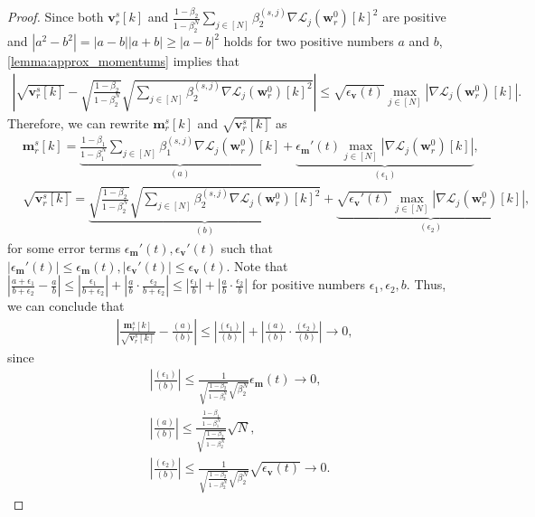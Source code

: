 \documentclass{article} %
\theoremstyle{plain}
\theoremstyle{definition}
\theoremstyle{remark}
\def\bigabs#1{\left|#1\right|}
\newcommand{\Ls}{\mathcal{L}}
\def\bm{{\mathbf m}}
\def\bw{{\mathbf w}}
\def\bv{{\mathbf v}}
\begin{document}
\approxAdam*
\begin{proof}
    Since both $\bv_r^s[k]$ and $\frac{1-\beta_2}{1-\beta_2^N}\sum_{j \in [N]}\beta_2^{(s, j)}\nabla\Ls_{j}(\bw_r^0)[k]^2$ are positive and $|a^2-b^2| =|a-b||a+b|\geq |a-b|^2$ holds for two positive numbers $a$ and $b$, \cref{lemma:approx_momentums} implies that  
    \begin{align*}
        \bigabs{\sqrt{\bv_r^s[k]}-\sqrt{\frac{1-\beta_2}{1-\beta_2^N}} \sqrt{\sum_{j \in [N]}\beta_2^{(s, j)}\nabla\Ls_{j}(\bw_r^0)[k]^2}} \leq \sqrt{\epsilon_\bv(t)}\max_{j \in [N]}|\nabla \Ls_j(\bw_r^0)[k]|.
    \end{align*}
    Therefore, we can rewrite $\bm_r^s[k]$ and $\sqrt{\bv_r^s[k]}$ as
    \begin{align*}
        &\bm_r^s[k] = \underbrace{\frac{1-\beta_1}{1-\beta_1^N}\sum_{j \in [N]}\beta_1^{(s, j)}\nabla\Ls_{j}(\bw_r^0)[k]}_{(a)} + \underbrace{\epsilon_\bm'(t)\max_{j \in [N]}|\nabla \Ls_j(\bw_r^0)[k]|}_{(\epsilon_1)},\\
        &\sqrt{\bv_r^s[k]}=\underbrace{\sqrt{\frac{1-\beta_2}{1-\beta_2^N}} \sqrt{\sum_{j \in [N]}\beta_2^{(s, j)}\nabla\Ls_{j}(\bw_r^0)[k]^2}}_{(b)} + \underbrace{\sqrt{\epsilon_\bv'(t)}\max_{j \in [N]}|\nabla \Ls_j(\bw_r^0)[k]|}_{(\epsilon_2)},
    \end{align*}
    for some error terms $\epsilon_\bm'(t), \epsilon_\bv'(t)$ such that $|\epsilon_\bm'(t)| \leq \epsilon_\bm(t), |\epsilon_\bv'(t)| \leq \epsilon_\bv(t)$. Note that $\bigabs{\frac{a+\epsilon_1}{b+\epsilon_2}-\frac{a}{b}}\leq\bigabs{\frac{\epsilon_1}{b+\epsilon_2}}+\bigabs{\frac{a}{b}\cdot\frac{\epsilon_2}{b+\epsilon_2}} \leq \bigabs{\frac{\epsilon_1}{b}}+\bigabs{\frac{a}{b}\cdot\frac{\epsilon_2}{b}}$ for positive numbers $\epsilon_1, \epsilon_2, b$. Thus, we can conclude that
    \begin{align}\label{eq:update_error}
        \bigabs{\frac{\bm_r^s[k]}{\sqrt{\bv_r^s[k]}}-\frac{(a)}{(b)}} \leq \bigabs{\frac{(\epsilon_1)}{(b)}} + \bigabs{\frac{(a)}{(b)} \cdot \frac{(\epsilon_2)}{(b)}} \rightarrow 0,
    \end{align}
    since 
    \begin{align*}
        &\bigabs{\frac{(\epsilon_1)}{(b)}} \leq 
        \frac{1}{\sqrt{\frac{1-\beta_2}{1-\beta_2^N}} \sqrt{\beta_2^N}}\epsilon_\bm(t) \rightarrow 0,\\
        &\bigabs{\frac{(a)}{(b)}} \leq \frac{\frac{1-\beta_1}{1-\beta_1^N}}{\sqrt{\frac{1-\beta_2}{1-\beta_2^N}}} \sqrt{N}, \\
        &\bigabs{\frac{(\epsilon_2)}{(b)}} \leq \frac{1}{\sqrt{\frac{1-\beta_2}{1-\beta_2^N}} \sqrt{\beta_2^N}}\sqrt{\epsilon_\bv(t)} \rightarrow 0.
    \end{align*}
    

\end{proof}
\end{document}
